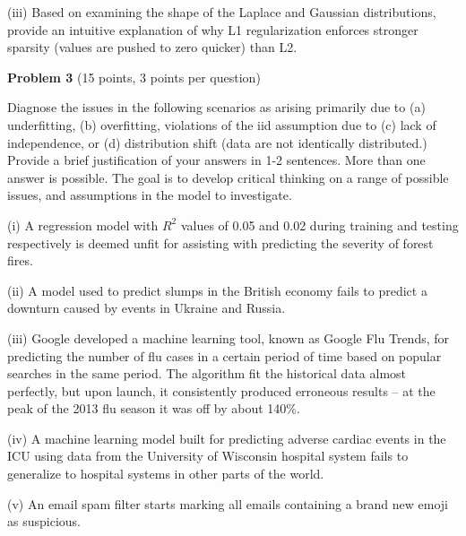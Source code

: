 \documentclass[letterpaper, 11pt]{article}
\newcommand{\problemAnswer}[1]{%
	\noindent\framebox[0.95\columnwidth][c]{\begin{minipage}{0.92\columnwidth}\color{blue}{#1}\end{minipage}} %
}
\begin{document}
(iii) Based on examining the shape of the Laplace and Gaussian distributions, provide an intuitive explanation of why L1 regularization enforces stronger sparsity (values are pushed to zero quicker) than L2.


\problemAnswer{

	
	\vspace*{150pt}
}



\vspace{1em}



{\large\textbf{Problem 3} (15 points, 3 points per question)
	
Diagnose the issues in the following scenarios as arising primarily due to (a) underfitting, (b) overfitting, violations of the iid assumption due to (c) lack of independence, or (d) distribution shift (data are not identically distributed.) Provide a brief justification of your answers in 1-2 sentences. More than one answer is possible. The goal is to develop critical thinking on a range of possible issues, and assumptions in the model to investigate.

(i) A  regression model with $R^2$ values of 0.05 and 0.02 during training and testing respectively is deemed unfit for assisting with predicting the severity of forest fires.


(ii) A model used to predict slumps in the British economy fails to predict a downturn caused by events in Ukraine and Russia.

(iii) Google developed a machine learning tool, known as Google Flu Trends, for predicting the number of flu cases in a certain period of time based on popular searches in the same period. The algorithm fit the historical data almost perfectly, but upon launch, it consistently produced erroneous results --  at the peak of the 2013 flu season it was off by about 140\%. 

(iv) A machine learning model built for predicting adverse cardiac events in the ICU using data from the University of Wisconsin hospital system fails to generalize to hospital systems in other parts of the world.

(v) An email spam filter starts marking all emails containing a brand new emoji as suspicious.

\problemAnswer{
	
	\vspace*{150pt}
}

\vspace{1em}

}
\end{document}
